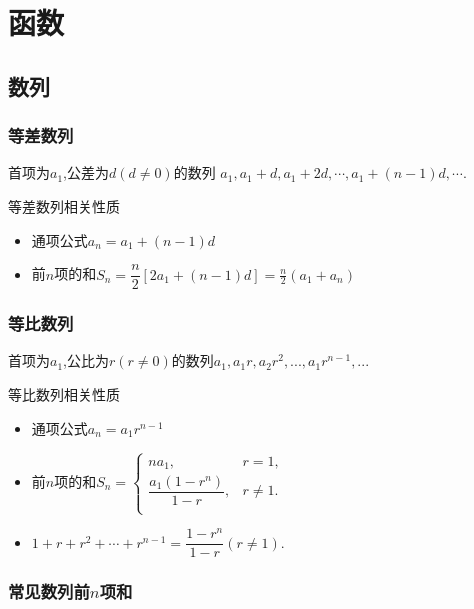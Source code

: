 \documentclass[8pt a4paper, oneside, UTF8]{ctexbook}  %
\begin{document}
\begin{sloppypar}
    \else
    \fi
    \chapter{函数}
    \section{数列}
    \subsection{等差数列}
    首项为$a_1$,公差为$d(d \neq 0)$的数列 $a_1,a_1+d,a_1+2d,\cdots,a_1+(n-1)d,\cdots$.
    \begin{criterion}{等差数列相关性质}{}
        \begin{itemize}
            \item 通项公式$a_n=a_1+(n-1)d$
            \item 前$n$项的和$S_n=\dfrac{n}{2}[2a_1+(n-1)d]=\frac{n}{2}(a_1+a_n)$
        \end{itemize}
    \end{criterion}
    \subsection{等比数列}
    首项为$a_1$,公比为$r(r \neq 0)$的数列$a_1,a_1r,a_2r^2,...,a_1r^{n-1},...$
    \begin{criterion}{等比数列相关性质}{}
        \begin{itemize}
            \item 通项公式$a_n=a_1r^{n-1}$
            \item 前$n$项的和$S_{n}=\left\{\begin{matrix}{na_{1},}&{r=1,}\\{\dfrac{a_{1}\left(1-r^{n}\right)}{1-r},}&{r\neq1.}\\\end{matrix}\right.$
            \item $1+r+r^2+\cdots+r^{n-1}=\dfrac{1-r^n}{1-r}(r\neq1).$
        \end{itemize}
    \end{criterion}
    \subsection{常见数列前$n$项和}
    \begin{center}
    \end{center}

\end{sloppypar}
\end{document}
